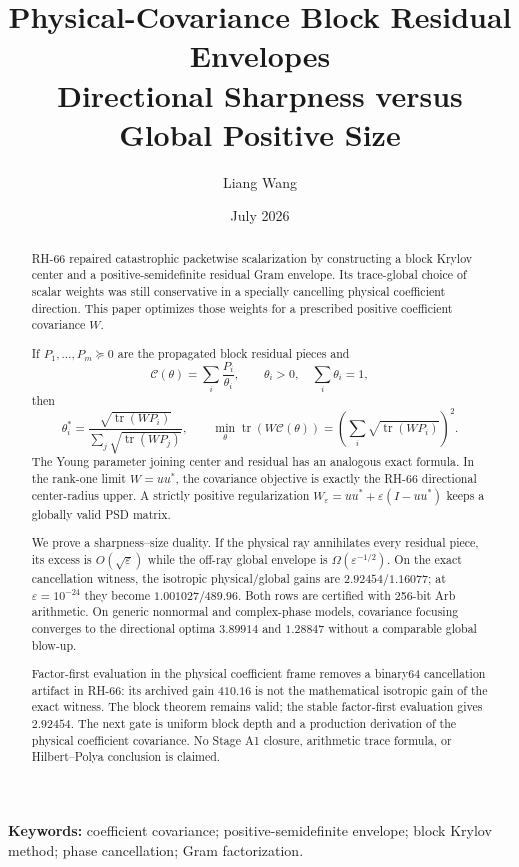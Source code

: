 \documentclass[11pt]{article}
\title{Physical-Covariance Block Residual Envelopes\\
\large Directional Sharpness versus Global Positive Size}
\author{Liang Wang}
\date{July 2026}
\newcommand{\tr}{\operatorname{tr}}
\begin{document}
\maketitle

\begin{abstract}
RH-66 repaired catastrophic packetwise scalarization by constructing a
block Krylov center and a positive-semidefinite residual Gram envelope.  Its
trace-global choice of scalar weights was still conservative in a specially
cancelling physical coefficient direction.  This paper optimizes those
weights for a prescribed positive coefficient covariance $W$.

If $P_1,\ldots,P_m\succeq0$ are the propagated block residual pieces and
\[
 \mathcal C(\theta)=\sum_i\frac{P_i}{\theta_i},
 \qquad \theta_i>0,\quad\sum_i\theta_i=1,
\]
then
\[
 \theta_i^*=
 \frac{\sqrt{\tr(WP_i)}}{\sum_j\sqrt{\tr(WP_j)}},
 \qquad
 \min_\theta\tr(W\mathcal C(\theta))
 =\left(\sum_i\sqrt{\tr(WP_i)}\right)^2.
\]
The Young parameter joining center and residual has an analogous exact
formula.  In the rank-one limit $W=uu^*$, the covariance objective is exactly
the RH-66 directional center-radius upper.  A strictly positive regularization
$W_\varepsilon=uu^*+\varepsilon(I-uu^*)$ keeps a globally valid PSD matrix.

We prove a sharpness--size duality.  If the physical ray annihilates every
residual piece, its excess is $O(\sqrt\varepsilon)$ while the off-ray global
envelope is $\Omega(\varepsilon^{-1/2})$.  On the exact cancellation witness,
the isotropic physical/global gains are $2.92454/1.16077$; at
$\varepsilon=10^{-24}$ they become $1.001027/489.96$.  Both rows are
certified with 256-bit Arb arithmetic.  On generic nonnormal and complex-phase
models, covariance focusing converges to the directional optima $3.89914$ and
$1.28847$ without a comparable global blow-up.

Factor-first evaluation in the physical coefficient frame removes a
binary64 cancellation artifact in RH-66: its archived gain $410.16$ is not
the mathematical isotropic gain of the exact witness.  The block theorem
remains valid; the stable factor-first evaluation gives $2.92454$.  The next
gate is uniform block depth and a production derivation of the physical
coefficient covariance.  No Stage A1 closure, arithmetic trace formula, or
Hilbert--Polya conclusion is claimed.
\end{abstract}

\noindent\textbf{Keywords:} coefficient covariance; positive-semidefinite
envelope; block Krylov method; phase cancellation; Gram factorization.
\end{document}
